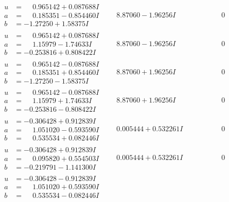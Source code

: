\documentclass[1p]{elsarticle_modified}
\theoremstyle{definition}
\begin{document}
$$\begin{array}{c|c|c}
\begin{aligned}
u &= \phantom{-}0.965142 + 0.087688 I \\
a &= \phantom{-}0.185351 - 0.854460 I \\
b &= -1.27250 + 1.58375 I\end{aligned}
 & \phantom{-}8.87060 - 1.96256 I & \phantom{-0.000000 } 0 \\ \hline\begin{aligned}
u &= \phantom{-}0.965142 + 0.087688 I \\
a &= \phantom{-}1.15979 - 1.74633 I \\
b &= -0.253816 + 0.808422 I\end{aligned}
 & \phantom{-}8.87060 - 1.96256 I & \phantom{-0.000000 } 0 \\ \hline\begin{aligned}
u &= \phantom{-}0.965142 - 0.087688 I \\
a &= \phantom{-}0.185351 + 0.854460 I \\
b &= -1.27250 - 1.58375 I\end{aligned}
 & \phantom{-}8.87060 + 1.96256 I & \phantom{-0.000000 } 0 \\ \hline\begin{aligned}
u &= \phantom{-}0.965142 - 0.087688 I \\
a &= \phantom{-}1.15979 + 1.74633 I \\
b &= -0.253816 - 0.808422 I\end{aligned}
 & \phantom{-}8.87060 + 1.96256 I & \phantom{-0.000000 } 0 \\ \hline\begin{aligned}
u &= -0.306428 + 0.912839 I \\
a &= \phantom{-}1.051020 - 0.593590 I \\
b &= \phantom{-}0.535534 + 0.082446 I\end{aligned}
 & \phantom{-}0.005444 + 0.532261 I & \phantom{-0.000000 } 0 \\ \hline\begin{aligned}
u &= -0.306428 + 0.912839 I \\
a &= \phantom{-}0.095820 + 0.554503 I \\
b &= -0.219791 - 1.141300 I\end{aligned}
 & \phantom{-}0.005444 + 0.532261 I & \phantom{-0.000000 } 0 \\ \hline\begin{aligned}
u &= -0.306428 - 0.912839 I \\
a &= \phantom{-}1.051020 + 0.593590 I \\
b &= \phantom{-}0.535534 - 0.082446 I\end{aligned}

\end{array}$$
\end{document}
